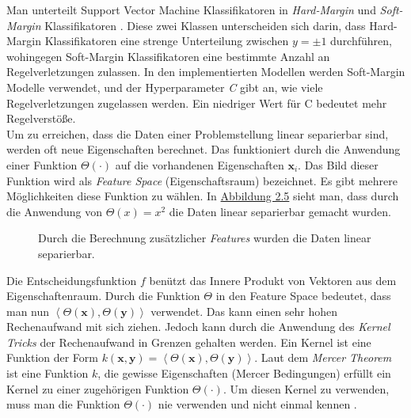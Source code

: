 Man unterteilt Support Vector Machine Klassifikatoren in \textit{Hard-Margin} und \textit{Soft-Margin} Klassifikatoren \cite{shalev}. Diese zwei Klassen 
unterscheiden sich darin, dass Hard-Margin Klassifikatoren eine strenge Unterteilung zwischen $y = \pm1$ durchf\"uhren, wohingegen Soft-Margin 
Klassifikatoren eine bestimmte Anzahl an Regelverletzungen zulassen. In den implementierten Modellen werden Soft-Margin Modelle verwendet, und der 
Hyperparameter \textit{C} gibt an, wie viele Regelverletzungen zugelassen werden. Ein niedriger Wert f\"ur C bedeutet mehr Regelverst\"o{\ss}e.  \\

Um zu erreichen, dass die Daten einer Problemstellung linear separierbar sind, werden oft neue Eigenschaften berechnet. Das funktioniert durch die 
Anwendung einer Funktion $\Theta(\cdot)$ auf die vorhandenen Eigenschaften $\mathbf{x}_i$. Das Bild dieser Funktion wird als \textit{Feature Space} (Eigenschaftsraum) bezeichnet.
Es gibt mehrere M\"oglichkeiten diese Funktion zu w\"ahlen. In 
\hyperref[fig:svm2]{Abbildung 2.5} sieht man, dass durch die Anwendung von $\Theta(x) = x^2$ die Daten linear separierbar gemacht wurden. \\

\begin{figure}[ht]
  \label{fig:svm2}
  \begin{center}
    \begin{tiny}
    \end{tiny}
  \end{center}
  \caption[Berechnung zus\"atzlicher Features aus vorhandenen Inputs]
    {Durch die Berechnung zus\"atzlicher \textit{Features} wurden die Daten linear separierbar.}
\end{figure}

Die Entscheidungsfunktion $f$ ben\"utzt das Innere Produkt von Vektoren aus dem Eigenschaftenraum. Durch die Funktion $\Theta$ in den
Feature Space bedeutet, dass man nun $\left\langle \Theta(\mathbf{x}), \Theta(\mathbf{y}) \right\rangle$ verwendet. Das kann einen sehr hohen Rechenaufwand 
mit sich ziehen. Jedoch kann durch die Anwendung des \textit{Kernel Tricks} der Rechenaufwand in Grenzen gehalten werden. Ein Kernel ist eine Funktion 
der Form $k(\mathbf{x}, \mathbf{y}) = \left\langle \Theta(\mathbf{x}), \Theta(\mathbf{y}) \right\rangle$. Laut dem \textit{Mercer Theorem} ist eine Funktion 
$k$, die gewisse Eigenschaften (Mercer Bedingungen) erf\"ullt ein Kernel zu einer zugeh\"origen Funktion $\Theta(\cdot)$. Um 
diesen Kernel zu verwenden, muss man die Funktion $\Theta(\cdot)$ nie verwenden und nicht einmal kennen \cite{handson}. \\

